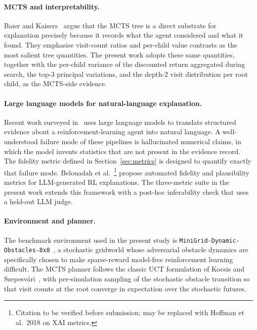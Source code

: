 \documentclass[conference]{IEEEtran}
\begin{document}
\paragraph{MCTS and interpretability.}
Baier and Kaisers~\cite{baier2021explain} argue that the MCTS tree is
a direct substrate for explanation precisely because it records what
the agent considered and what it found. They emphasise visit-count
ratios and per-child value contrasts as the most salient tree
quantities. The present work adopts these same quantities, together
with the per-child variance of the discounted return aggregated
during search, the top-3 principal variations, and the depth-2 visit
distribution per root child, as the MCTS-side evidence.

\paragraph{Large language models for natural-language explanation.}
Recent work surveyed in~\cite{milani2024xrl} uses large language
models to translate structured evidence about a reinforcement-learning
agent into natural language. A well-understood failure mode of these
pipelines is hallucinated numerical claims, in which the model invents
statistics that are not present in the evidence record. The fidelity
metric defined in Section~\ref{sec:metrics} is designed to quantify
exactly that failure mode. Belouadah et
al.~\cite{belouadah2025llm}\footnote{Citation to be verified before
submission; may be replaced with Hoffman et al.\ 2018 on XAI metrics.}
propose automated fidelity and plausibility metrics for
LLM-generated RL explanations. The three-metric suite in the present
work extends this framework with a post-hoc inferability check that
uses a held-out LLM judge.

\paragraph{Environment and planner.}
The benchmark environment used in the present study is
\texttt{MiniGrid-Dynamic-Obstacles-8x8}~\cite{minigrid}, a stochastic
gridworld whose adversarial obstacle dynamics are specifically chosen
to make sparse-reward model-free reinforcement learning difficult. The
MCTS planner follows the classic UCT formulation of Kocsis and
Szepesv\'ari~\cite{kocsis2006uct}, with per-simulation sampling of
the stochastic obstacle transition so that visit counts at the root
converge in expectation over the stochastic futures.
\end{document}

